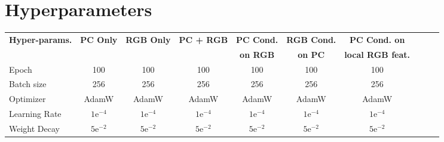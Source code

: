 \section{Hyperparameters}

\begin{table}[h!]
    \centering
    \renewcommand{\arraystretch}{1.4}
    \setlength{\aboverulesep}{0pt}
    \setlength{\belowrulesep}{0pt}
    \begin{adjustbox}{max width=0.8\textwidth}
    \begin{tabular}{l c c c c c c c c c}
        \toprule
        \multirow{2}{*}{\textbf{Hyper-params.}}
        & \multirow{2}{*}{\textbf{PC Only}} 
        & \multirow{2}{*}{\textbf{RGB Only}} 
        & \multirow{2}{*}{\textbf{PC + RGB}}
        & \textbf{PC Cond.}
        & \textbf{RGB Cond.}
        & \textbf{PC Cond. on}\\        
                          &          &          &          &   \textbf{on RGB}    &    \textbf{on PC}    &  \textbf{local RGB feat.}      \\
        \midrule
        Epoch             &     100          &    100      &              100       &          100            &         100             &               100                    \\
        Batch size        &   256             &    256      &              256        &      256                &       256               &       256                            \\
        Optimizer         &    AdamW          &    AdamW      &          AdamW            &           AdamW           &          AdamW            &        AdamW                           \\
        Learning Rate     &         $1\mathrm{e}^{-4}$      &    $1\mathrm{e}^{-4}$      &            $1\mathrm{e}^{-4}$          &           $1\mathrm{e}^{-4}$           &                      $1\mathrm{e}^{-4}$    & $1\mathrm{e}^{-4}$                        \\
        Weight Decay            &    $5\mathrm{e}^{-2}$        &      $5\mathrm{e}^{-2}$      &         $5\mathrm{e}^{-2}$               &        $5\mathrm{e}^{-2}$                &          $5\mathrm{e}^{-2}$              &      $5\mathrm{e}^{-2}$                               \\

\end{tabular}
\end{adjustbox}
\end{table}
